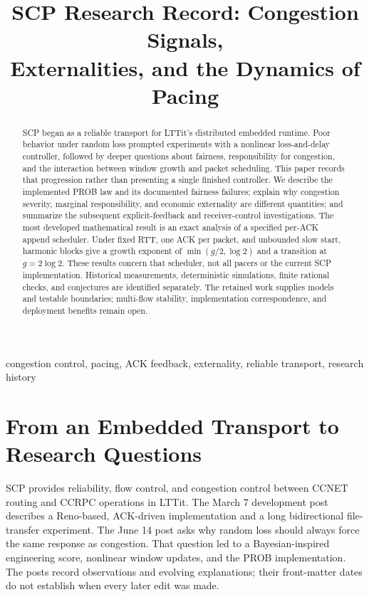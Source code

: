 \documentclass[conference,letterpaper]{IEEEtran}
\title{SCP Research Record: Congestion Signals,\\Externalities, and the Dynamics of Pacing}
\author{\IEEEauthorblockN{Skai Uijing}\IEEEauthorblockA{LTTit Research\\Research record, October 6, 2026}}
\begin{document}
\maketitle
\begin{abstract}
SCP began as a reliable transport for LTTit's distributed embedded runtime. Poor behavior under random loss prompted experiments with a nonlinear loss-and-delay controller, followed by deeper questions about fairness, responsibility for congestion, and the interaction between window growth and packet scheduling. This paper records that progression rather than presenting a single finished controller. We describe the implemented PROB law and its documented fairness failures; explain why congestion severity, marginal responsibility, and economic externality are different quantities; and summarize the subsequent explicit-feedback and receiver-control investigations. The most developed mathematical result is an exact analysis of a specified per-ACK append scheduler. Under fixed RTT, one ACK per packet, and unbounded slow start, harmonic blocks give a growth exponent of $\min(g/2,\log 2)$ and a transition at $g=2\log 2$. These results concern that scheduler, not all pacers or the current SCP implementation. Historical measurements, deterministic simulations, finite rational checks, and conjectures are identified separately. The retained work supplies models and testable boundaries; multi-flow stability, implementation correspondence, and deployment benefits remain open.
\end{abstract}
\begin{IEEEkeywords}
congestion control, pacing, ACK feedback, externality, reliable transport, research history
\end{IEEEkeywords}

\section{From an Embedded Transport to Research Questions}
SCP provides reliability, flow control, and congestion control between CCNET routing and CCRPC operations in LTTit. The March 7 development post describes a Reno-based, ACK-driven implementation and a long bidirectional file-transfer experiment. The June 14 post asks why random loss should always force the same response as congestion. That question led to a Bayesian-inspired engineering score, nonlinear window updates, and the PROB implementation. The posts record observations and evolving explanations; their front-matter dates do not establish when every later edit was made.
\end{document}
